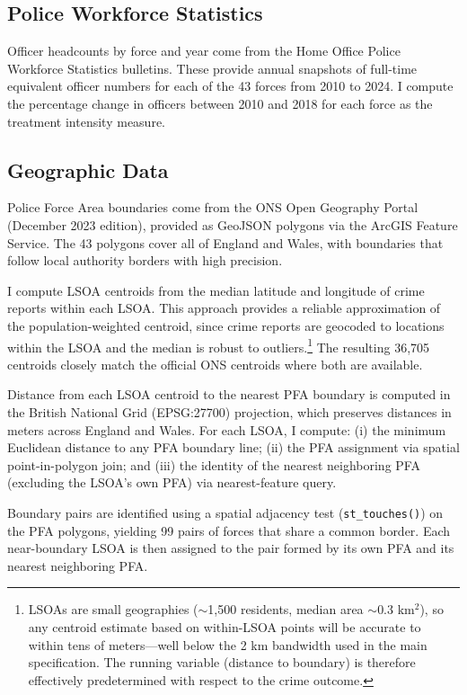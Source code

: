 \documentclass[12pt]{article}
\begin{document}
\subsection{Police Workforce Statistics}

Officer headcounts by force and year come from the Home Office Police Workforce Statistics bulletins. These provide annual snapshots of full-time equivalent officer numbers for each of the 43 forces from 2010 to 2024. I compute the percentage change in officers between 2010 and 2018 for each force as the treatment intensity measure.

\subsection{Geographic Data}

Police Force Area boundaries come from the ONS Open Geography Portal (December 2023 edition), provided as GeoJSON polygons via the ArcGIS Feature Service. The 43 polygons cover all of England and Wales, with boundaries that follow local authority borders with high precision.

I compute LSOA centroids from the median latitude and longitude of crime reports within each LSOA. This approach provides a reliable approximation of the population-weighted centroid, since crime reports are geocoded to locations within the LSOA and the median is robust to outliers.\footnote{LSOAs are small geographies ($\sim$1,500 residents, median area $\sim$0.3 km$^2$), so any centroid estimate based on within-LSOA points will be accurate to within tens of meters---well below the 2 km bandwidth used in the main specification. The running variable (distance to boundary) is therefore effectively predetermined with respect to the crime outcome.} The resulting 36,705 centroids closely match the official ONS centroids where both are available.

Distance from each LSOA centroid to the nearest PFA boundary is computed in the British National Grid (EPSG:27700) projection, which preserves distances in meters across England and Wales. For each LSOA, I compute: (i) the minimum Euclidean distance to any PFA boundary line; (ii) the PFA assignment via spatial point-in-polygon join; and (iii) the identity of the nearest neighboring PFA (excluding the LSOA's own PFA) via nearest-feature query.

Boundary pairs are identified using a spatial adjacency test (\texttt{st\_touches()}) on the PFA polygons, yielding 99 pairs of forces that share a common border. Each near-boundary LSOA is then assigned to the pair formed by its own PFA and its nearest neighboring PFA.
\end{document}
